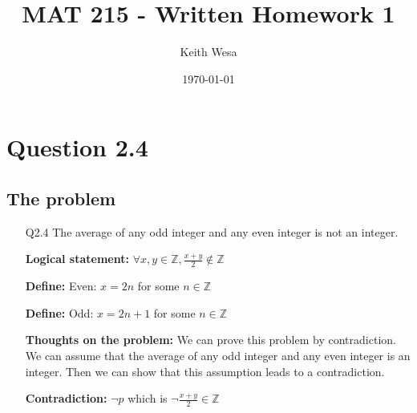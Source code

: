 \documentclass{article}
\author{Keith Wesa}
\title{MAT 215 - Written Homework 1}
\date{\today}
\begin{document}
\section*{Question 2.4}
\subsection*{The problem}
\begin{itemize}
    \item[Q2.4] The average of any odd integer and any even integer is not an integer.
    \item[] \textbf{Logical statement:} $\forall x, y \in \mathbb{Z}, \frac{x + y}{2} \notin \mathbb{Z}$
    \item[] \textbf{Define: } Even: $x = 2n$ for some $n \in \mathbb{Z}$
    \item[] \textbf{Define: } Odd: $x = 2n + 1$ for some $n \in \mathbb{Z}$
    \item[] \textbf{Thoughts on the problem: } We can prove this problem by contradiction. We can assume that the average of any odd integer and any even integer is an integer. Then we can show that this assumption leads to a contradiction.
    \item[] \textbf{Contradiction:} $\lnot p$ which is $\lnot \frac{x + y}{2} \in \mathbb{Z}$
\end{itemize}
\end{document}

